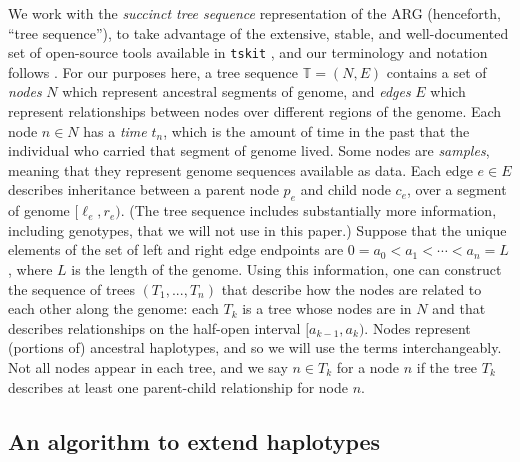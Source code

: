 \documentclass[10pt,twoside,lineno]{gsajnl}
\newcommand{\T}{\mathbb{T}}
\newcommand{\tskit}{\texttt{tskit}}
\begin{document}
We work with the \emph{succinct tree sequence} representation of the ARG (henceforth, ``tree sequence''),
to take advantage of the extensive, stable, and well-documented set of open-source tools
available in \tskit{} \citep{tskit}, 
and our terminology and notation follows \citet{ralph2020efficiently}.
For our purposes here,
a tree sequence $\T = (N, E)$ contains a set of \emph{nodes} $N$ 
which represent ancestral segments of genome,
and \emph{edges} $E$ which represent relationships between nodes over different regions of the genome.
Each node $n \in N$ has a \emph{time} $t_n$,
which is the amount of time in the past that the individual who carried that segment of genome lived.
Some nodes are \emph{samples}, meaning that they represent genome sequences available as data.
Each edge $e \in E$ describes inheritance between a parent node $p_e$ and child node $c_e$,
over a segment of genome $[\ell_e, r_e)$.
(The tree sequence includes substantially more information, including genotypes, that we will not use in this paper.)
Suppose that the unique elements of the set of left and right edge endpoints
are $0 = a_0 < a_1 < \cdots < a_{n} = L$, where $L$ is the length of the genome.
Using this information, one can construct the sequence of 
trees $\left(T_1,...,T_{n}\right)$ that describe how the nodes are related to each other along the genome:
each $T_k$ is a tree whose nodes are in $N$
and that describes relationships on the half-open interval $[a_{k-1}, a_k)$.
Nodes represent (portions of) ancestral haplotypes, and so
we will use the terms interchangeably.
Not all nodes appear in each tree,
and we say $n \in T_k$ for a node $n$ if the tree $T_k$ describes at least one parent-child relationship
for node $n$.

\subsection{An algorithm to extend haplotypes}
\end{document}
